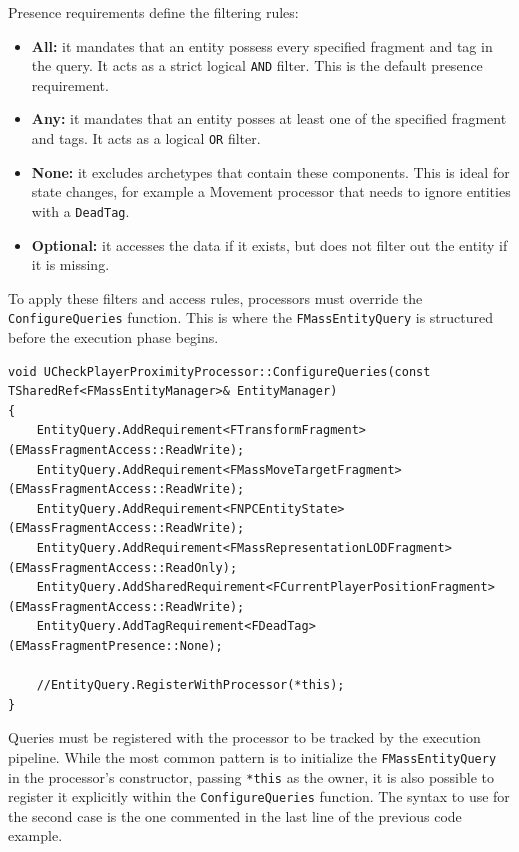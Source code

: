 Presence requirements define the filtering rules:

\begin{itemize}
    \item \textbf{All:} it mandates that an entity possess every specified fragment and tag in the query. It acts as a strict logical \texttt{AND} filter. This is the default presence requirement.
    \item \textbf{Any:} it mandates that an entity posses at least one of the specified fragment and tags. It acts as a logical \texttt{OR} filter.
    \item \textbf{None:} it excludes archetypes that contain these components. This is ideal for state changes, for example a Movement processor that needs to ignore entities with a \texttt{DeadTag}.
    \item \textbf{Optional:} it accesses the data if it exists, but does not filter out the entity if it is missing.
\end{itemize}

To apply these filters and access rules, processors must override the \newline\texttt{ConfigureQueries} function. This is where the \texttt{FMassEntityQuery} is structured before the execution phase begins.

\begin{lstlisting}
void UCheckPlayerProximityProcessor::ConfigureQueries(const TSharedRef<FMassEntityManager>& EntityManager)
{
	EntityQuery.AddRequirement<FTransformFragment>(EMassFragmentAccess::ReadWrite);
	EntityQuery.AddRequirement<FMassMoveTargetFragment>(EMassFragmentAccess::ReadWrite);
	EntityQuery.AddRequirement<FNPCEntityState>(EMassFragmentAccess::ReadWrite);
	EntityQuery.AddRequirement<FMassRepresentationLODFragment>(EMassFragmentAccess::ReadOnly);
	EntityQuery.AddSharedRequirement<FCurrentPlayerPositionFragment>(EMassFragmentAccess::ReadWrite);
	EntityQuery.AddTagRequirement<FDeadTag>(EMassFragmentPresence::None);

    //EntityQuery.RegisterWithProcessor(*this);
}
\end{lstlisting}

Queries must be registered with the processor to be tracked by the execution pipeline. While the most common pattern is to initialize the \texttt{FMassEntityQuery} in the processor's constructor, passing \texttt{*this} as the owner, it is also possible to register it explicitly within the \texttt{ConfigureQueries} function. The syntax to use for the second case is the one commented in the last line of the previous code example.

